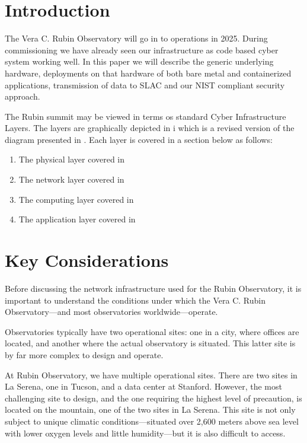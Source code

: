 \section{Introduction}

The Vera C. Rubin Observatory\cite{2019ApJ...873..111I} will go in to operations in 2025.
During commissioning we have already seen our infrastructure as code based cyber system working well.
In this paper we will describe the generic underlying hardware, deployments on that hardware of both bare metal and containerized applications, transmission of data to SLAC and our NIST\cite{NIST.SP.800-171} compliant security approach.

The Rubin summit may be viewed in terms os standard Cyber Infrastructure Layers.
The layers are graphically depicted in i which is a revised version of the diagram presented in \cite{2019arXiv190713060O}.
Each layer is covered in a section below as follows:

\begin{enumerate}
\item The physical layer covered in 
\item The network layer covered in 
\item The computing layer covered in 
\item The application layer covered in 
\end{enumerate}

\section{Key Considerations}
Before discussing the network infrastructure used for the Rubin Observatory, it is important to understand the conditions under which the Vera C. Rubin Observatory—and most observatories worldwide—operate. 

Observatories typically have two operational sites: one in a city, where offices are located, and another where the actual observatory is situated. This latter site is by far more complex to design and operate.

At Rubin Observatory, we have multiple operational sites. There are two sites in La Serena, one in Tucson, and a data center at Stanford. However, the most challenging site to design, and the one requiring the highest level of precaution, is located on the mountain, one of the two sites in La Serena. This site is not only subject to unique climatic conditions—situated over 2,600 meters above sea level with lower oxygen levels and little humidity—but it is also difficult to access.

